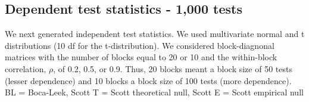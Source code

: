 \documentclass{article}\usepackage[]{graphicx}\usepackage[]{color}
\begin{document}
\clearpage

\subsection*{Dependent test statistics - 1,000 tests}

We next generated independent test statistics. We used multivariate normal and t distributions (10 df for the t-distribution). 
We considered block-diagnonal matrices with the number of blocks equal to 20 or 10 and the within-block correlation, $\rho$, of 0.2, 0.5, or 0.9. Thus, 20 blocks meant a block size of 50 tests (lesser dependence) and 10 blocks a block size of 100 tests (more dependence).
\\
BL = Boca-Leek, Scott T = Scott theoretical null, Scott E = Scott empirical null
\end{document}
